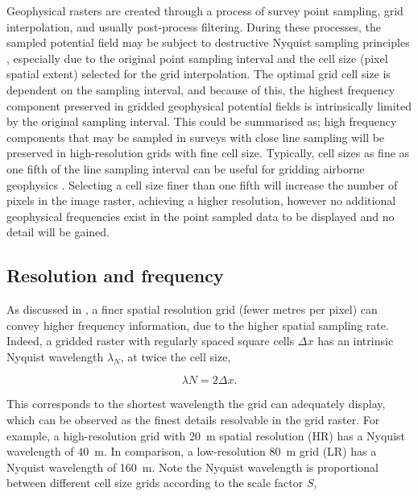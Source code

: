 \documentclass[manuscript.tex]{subfiles}
\begin{document}
Geophysical rasters are created through a process of survey point sampling, grid interpolation, and usually post-process filtering.
During these processes, the sampled potential field may be subject to destructive Nyquist sampling principles \parencite[26]{dentithGeophysicsMineralExploration2014}, especially due to the original point sampling interval and the cell size (pixel spatial extent) selected for the grid interpolation.
The optimal grid cell size is dependent on the sampling interval, and because of this, the highest frequency component preserved in gridded geophysical potential fields is intrinsically limited by the original sampling interval.
This could be summarised as; high frequency components that may be sampled in surveys with close line sampling will be preserved in high-resolution grids with fine cell size.
Typically, cell sizes as fine as one fifth of the line sampling interval can be useful for gridding airborne geophysics \parencite{reidAeromagneticSurveyDesign1980}.
Selecting a cell size finer than one fifth will increase the number of pixels in the image raster, achieving a higher resolution, however no additional geophysical frequencies exist in the point sampled data to be displayed and no detail will be gained.

\subsection{Resolution and frequency}
As discussed in , a finer spatial resolution grid (fewer metres per pixel) can convey higher frequency information, due to the higher spatial sampling rate.
Indeed, a gridded raster with regularly spaced square cells \(\Delta x\) has an intrinsic Nyquist wavelength \(\lambda _N\), at twice the cell size,

\begin{equation}
    \label{eqn:nyq}
    \lambda{}N = 2 \Delta{}x.
\end{equation}

This corresponds to the shortest wavelength the grid can adequately display, which can be observed as the finest details resolvable in the grid raster.
For example, a high-resolution grid with \qty{20}{\metre} spatial resolution (HR) has a Nyquist wavelength of \qty{40}{\metre}.
In comparison, a low-resolution \qty{80}{\metre} grid (LR) has a Nyquist wavelength of \qty{160}{\metre}.
Note the Nyquist wavelength is proportional between different cell size grids according to the scale factor \(S\),
\end{document}
